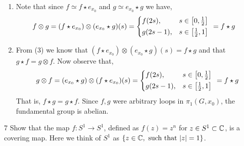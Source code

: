 \documentclass[12pt]{article}
\begin{document}
\begin{solution}
\begin{enumerate}
        \item Note that since $f \simeq f \star e_{x_0}$ and $g \simeq e_{x_0} \star g  $ we have, 
        \begin{align*}
            f \otimes g = 
            (f \star e_{x_0})\otimes(e_{x_0}\star g)(s) &=  \begin{cases*}
                f(2s), & $s \in \left[0, \frac{1}{2}\right]$ \\ 
                g(2s-1), & $s \in \left[\frac{1}{2}, 1\right]$
            \end{cases*} 
            = f \star g
        \end{align*}
       
        \item From (3) we know that $(f \star e_{x_0})\otimes(e_{x_0}\star g)(s) =  f \star g$ and that $g \star f = g \otimes f$. Now observe that, 
        \[ g \otimes f = (e_{x_0} \star g)\otimes(f \star e_{x_0})(s) =  \begin{cases*}
                f(2s), & $s \in \left[0, \frac{1}{2}\right]$ \\ 
                g(2s-1), & $s \in \left[\frac{1}{2}, 1\right]$
            \end{cases*} 
            = f \star g\]
        That is, $f \star g = g \star f$. Since $f,g$ were arbitrary loops in $\pi_1(G, x_0)$, the fundamental group is abelian.
    \end{enumerate}
\end{solution}

\newpage 

\begin{problem}{7}
    Show that the map $f: S^1 \to S^1$, defined as $f(z) = z^n$ for $z \in S^1 \subset \mathbb C$, is a covering map. Here we think of $S^1$ as $\{z \in \mathbb C, \text{ such that } |z| = 1\}$.
\end{problem}
\end{document}
